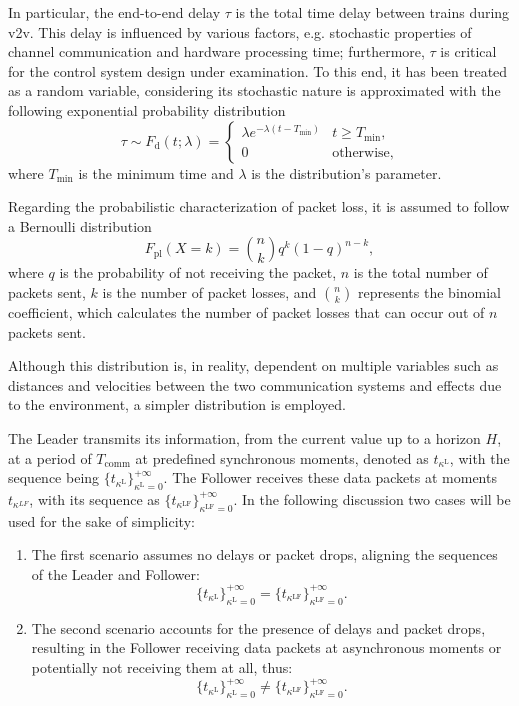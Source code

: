 In particular, the end-to-end delay $\tau$ is the total time delay between trains during \gls{v2v}. This delay is influenced by various factors, e.g. stochastic properties of channel communication and hardware processing time; furthermore, $\tau$  is  critical for the control system design under examination. To this end, it has been treated as a random variable, considering its stochastic nature is  approximated with the following exponential probability distribution 
%
\begin{equation} \label{eq:pdfDelay}
	\tau \sim F_{\mathrm{d}} (t;\lambda) = \begin{cases}\lambda e^{-\lambda (t-T_\mathrm{min})} & t \geq T_\mathrm{min}, \\ 0 & \text{otherwise},\end{cases}
\end{equation}
where $T_\mathrm{min}$ is the minimum time and $\lambda$ is the distribution's parameter.


Regarding the probabilistic characterization of packet loss, it is assumed to follow a Bernoulli distribution
\begin{equation} \label{pr_packet_loss}
	F_{\mathrm{pl}}(X = k) = \binom{n}{k} q^k  (1-q)^{n-k},
\end{equation}
where $q$  is the probability of not receiving the packet, $n$ is the total number of packets sent, $k$ is the number of packet losses, and $\binom{n}{k}$ represents the binomial coefficient, which calculates the number of packet losses that can occur out of $n$ packets sent.

Although this distribution is, in reality, dependent on multiple variables such as distances and velocities between the two communication systems and effects due to the environment, a simpler distribution is employed.

The Leader transmits its information, from the current value up to a horizon \(H\), at a period of \(T_{\text{comm}}\) at predefined synchronous moments, denoted as \(t_{\kappa^\mathrm{L}}\), with the sequence being \(\{ t_{\kappa^\mathrm{L}} \}_{\kappa^\mathrm{L}=0}^{+\infty}\). The Follower receives these data packets at moments \(t_{\kappa^{LF}}\), with its sequence as \(\{ t_{\kappa^\mathrm{LF}} \}_{\kappa^\mathrm{LF}=0}^{+\infty}\).
%
In the following discussion two cases will be used for the sake of simplicity:
%
\begin{enumerate}
	\item \label{enum:channel1} The first scenario assumes no delays or packet drops, aligning the sequences of the Leader and Follower: 
	\[\{ t_{\kappa^\mathrm{L}} \}_{\kappa^\mathrm{L}=0}^{+\infty} = \{ t_{\kappa^\mathrm{LF}} \}_{\kappa^\mathrm{LF}=0}^{+\infty}.\]
	
	\item \label{enum:channel2} The second scenario accounts for the presence of delays and packet drops, resulting in the Follower receiving data packets at asynchronous moments or potentially not receiving them at all, thus: 
	\[\{ t_{\kappa^\mathrm{L}} \}_{\kappa^\mathrm{L}=0}^{+\infty} \neq \{ t_{\kappa^\mathrm{LF}} \}_{\kappa^\mathrm{LF}=0}^{+\infty}.\]
\end{enumerate}

